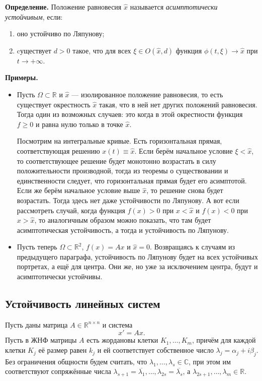 \textbf{Определение.} Положение равновесия $\widehat{x}$ называется \textit{асимптотически устойчивым}, если:
\begin{enumerate}
    \item оно устойчиво по Ляпунову;
    \item cуществует $d > 0$ такое, что для всех $\xi \in O(\widehat{x}, d)$ функция $\phi(t, \xi) \to \widehat{x}$ при $t \to +\infty$.
\end{enumerate}

\textbf{Примеры.} 
\begin{itemize}
    \item Пусть $\Omega \subset \mathbb R$ и $\widehat{x}$ --- изолированное положение равновесия, то есть существует окрестность $\widehat{x}$ такая, что в ней нет других положений равновесия.
        Тогда один из возможных случаев: это когда в этой окрестности функция $f \geq 0$ и равна нулю только в точке $\widehat{x}$.
        
        Посмотрим на интегральные кривые. Есть горизонтальная прямая, соответствующая решению
        $x(t) \equiv \widehat{x}$. Если берём начальное условие $\xi < \widehat{x}$, то соответствующее решение будет монотонно возрастать в силу положительности производной, тогда из теоремы о существовании и единственности следует, что горизонтальная прямая будет его асимптотой. Если же берём начальное условие выше $\widehat{x}$, то решение снова будет возрастать. Тогда здесь нет даже устойчивости по Ляпунову.
        А вот если рассмотреть случай, когда функция $f(x) > 0$ при $x < \widehat{x}$ и $f(x) < 0$ при $x > \widehat{x}$, то аналогичным образом можно показать, что там будет асимптотическая устойчивость, а тогда и устойчивость по Ляпунову.
    \item Пусть теперь $\Omega \subset \mathbb{R}^2$, $f(x) = Ax$ и $\widehat{x} = 0$. Возвращаясь к случаям из предыдущего параграфа, устойчивость по Ляпунову будет на всех устойчивых портретах, а ещё для центра. Они же, но уже за исключением центра, будут и асимптотически устойчивы.
    
\end{itemize}

\subsection{Устойчивость линейных систем}
Пусть даны матрица $A \in \mathbb R^{n \times n}$ и система
\begin{equation}
    x' = Ax.
\end{equation}
Пусть в ЖНФ матрицы $A$ есть жордановы клетки $K_1, \dots, K_m$, причём для каждой клетки $K_j$ её размер равен $k_j$ и ей соответствует собственное число $\lambda_j = \alpha_j + i\beta_j$. Без ограничения общности будем считать, что $\lambda_1, \dots, \lambda_s \in \mathbb C$, при этом им соответствуют сопряжённые числа $\lambda_{s+1} = \overline{\lambda_1}, \dots, \lambda_{2s} = \overline{\lambda_s}$, а $\lambda_{2s+1}, \dots, \lambda_m \in \mathbb R$.

